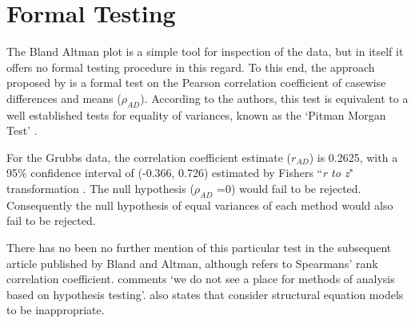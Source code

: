\documentclass[12pt, a4paper]{report}
\theoremstyle{plain}
\theoremstyle{definition}
\theoremstyle{remark}
\begin{document}
	



		
\section{Formal Testing}
The Bland Altman plot is a simple tool for inspection of the data,
but in itself it offers no formal testing procedure in this regard. To this end, the approach proposed by \citet{BA83} is a formal test on the Pearson correlation coefficient  of casewise differences and means ($\rho_{AD}$). According to the authors, this test is equivalent to a well established tests for equality of variances, known as the `Pitman Morgan Test' \citep{Pitman,
	Morgan}.

For the Grubbs data, the correlation coefficient estimate ($r_{AD}$) is 0.2625, with a 95\% confidence interval of (-0.366,
0.726) estimated by Fishers ``\textit{r to z}" transformation \citep{Cohen}. The null hypothesis ($\rho_{AD}$ =0) would fail to be rejected.
Consequently the null hypothesis of equal variances of each method would also fail to be rejected.

There has no been no further mention of this particular test in the subsequent article published by Bland and Altman, although
\citet{BA99} refers to Spearmans' rank correlation coefficient. \citet{BA99} comments `we do not see a
place for methods of analysis based on hypothesis testing'. \citet{BA99} also states that consider structural equation models
to be inappropriate.
\end{document}
